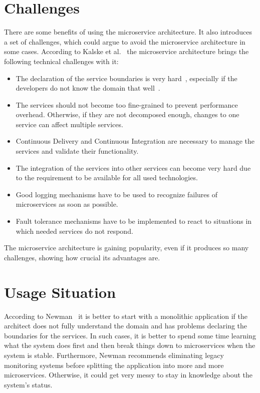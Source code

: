 \section{Challenges} \label{sec:microservice_challenges}
There are some benefits of using the microservice architecture.
It also introduces a set of challenges, which could argue to avoid the microservice architecture in some cases.
According to Kalske et al.~\cite{kalske2017challenges} the microservice architecture brings the following technical challenges with it: 
\begin{itemize}
    \item The declaration of the service boundaries is very hard~\cite{kalske2017challenges}, especially if the developers do not know the domain that well~\cite{newman2021building}.
    \item The services should not become too fine-grained to prevent performance overhead.
		Otherwise, if they are not decomposed enough, changes to one service can affect multiple services.
    \item Continuous Delivery and Continuous Integration are  necessary to manage the services and validate their functionality.
    \item The integration of the services into other services can become very hard due to the requirement to be available for all used technologies.
    \item Good logging mechanisms have to be used to recognize failures of microservices as soon as possible.
    \item Fault tolerance mechanisms have to be implemented to react to situations in which needed services do not respond.
\end{itemize}
The microservice architecture is gaining popularity, even if it produces so many challenges, showing how crucial its advantages are.

\section{Usage Situation}
According to Newman~\cite{newman2021building} it is better to start with a monolithic application if the architect does not fully understand the domain and has problems declaring the boundaries for the services.
In such cases, it is better to spend some time learning what the system does first and then break things down to microservices when the system is stable.
Furthermore, Newman recommends eliminating legacy monitoring systems before splitting the application into more and more microservices.
Otherwise, it could get very messy to stay in knowledge about the system's status.


